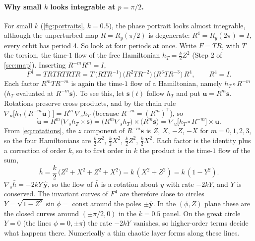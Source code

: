 \documentclass[11pt,a4paper]{article}
\newcommand{\vs}{\bm{s}}
\begin{document}
\paragraph{Why small $k$ looks integrable at $p = \pi/2$.} For small $k$ (\cref{fig:portraits}, $k=0.5$), the phase
portrait looks almost integrable, although the unperturbed map $R = R_y(\pi/2)$ is degenerate: $R^4 = R_y(2\pi) = I$,
every orbit has period 4. So look at four periods at once. Write $F = TR$, with $T$ the torsion, the time-$1$ flow of
the free Hamiltonian $h_T = \frac k2 Z^2$ (Step 2 of \cref{sec:map}). Inserting $R^{-m}R^m = I$,
\begin{equation*}
  F^4 = TRTRTRTR = T\,\big(RTR^{-1}\big)\,\big(R^2TR^{-2}\big)\,\big(R^3TR^{-3}\big)\,R^4 ,
  \qquad R^4 = I .
\end{equation*}
Each factor $R^mTR^{-m}$ is again the time-$1$ flow of a Hamiltonian, namely $h_T\circ R^{-m}$ ($h_T$ evaluated at
$R^{-m}\vs$). To see this, let $\vs(t)$ follow $h_T$ and put $\bm u = R^m\vs$. Rotations preserve cross products, and by
the chain rule $\nabla_{\!u}\big[h_T(R^{-m}\bm u)\big] = R^m\,\nabla_{\!s}h_T$ (because $R^{-m} = (R^m)^{\mathsf T}$),
so
\begin{equation*}
  \dot{\bm u} = R^m\big(\nabla_{\!s}h_T\times\vs\big) = \big(R^m\nabla_{\!s}h_T\big)\times\big(R^m\vs\big)
  = \nabla_{\!u}\big[h_T\circ R^{-m}\big]\times\bm u .
\end{equation*}
From \eqref{eq:rotations}, the $z$ component of $R^{-m}\vs$ is $Z$, $X$, $-Z$, $-X$ for $m = 0, 1, 2, 3$, so the four
Hamiltonians are $\frac k2 Z^2$, $\frac k2X^2$, $\frac k2 Z^2$, $\frac k2X^2$. Each factor is the identity plus a
correction of order $k$, so to first order in $k$ the product is the time-$1$ flow of the sum,
\begin{equation}\label{eq:hbar}
  \bar h = \frac{k}{2}\,\big(Z^2 + X^2 + Z^2 + X^2\big) = k\,(X^2 + Z^2) = k\,(1 - Y^2).
\end{equation}
$\nabla_{\!s}\bar h = -2kY\,\hat{\bm y}$, so the flow of $\bar h$ is a rotation about $y$ with rate $-2kY$, and $Y$ is
conserved. The invariant curves of $F^4$ are therefore close to circles $Y = \sqrt{1-Z^2}\sin\phi = $ const around the
poles $\pm\hat{\bm y}$. In the $(\phi,Z)$ plane these are the closed curves around $(\pm\pi/2, 0)$ in the $k=0.5$
panel. On the great circle $Y = 0$ (the lines $\phi = 0, \pm\pi$) the rate $-2kY$ vanishes, so higher-order terms
decide what happens there. Numerically a thin chaotic layer forms along these lines.
\end{document}
